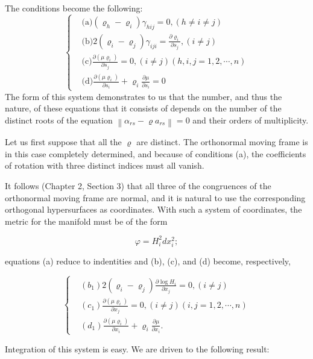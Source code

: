 \documentclass{book}
\begin{document}
The conditions become the following:
\begin{equation}
\begin{cases}
&\text{(a)}\displaystyle(\varrho_h-\varrho_i)\gamma_{hij}=0, (h\neq i\neq j)\\
&\text{(b)}\displaystyle2(\varrho_i-\varrho_j)\gamma_{iji}=\frac{\partial\varrho_i}{\partial s_j}, (i\neq j)\\
&\text{(c)}\displaystyle\frac{\partial(\mu\varrho_i)}{\partial s_j}=0, (i\neq j) (h,i,j=1,2,\cdots,n)\\
&\text{(d)}\displaystyle\frac{\partial(\mu\varrho_i)}{\partial s_i}+\varrho_i\frac{\partial\mu}{\partial s_i}=0
\end{cases}
\tag{E}
\end{equation}
The form of this system demonstrates to us that the number, and thus the nature, of these equations that it consists of depends on the number of the distinct roots of the equation $\left\|\alpha_{rs}-\varrho a_{rs}\right\|=0$ and their orders of multiplicity.

Let us first suppose that all the $\varrho$ are distinct. The orthonormal moving frame is in this case completely determined, and because of conditions (a), the coefficients of rotation with three distinct indices must all vanish.

It follows (Chapter 2, Section 3) that all three of the congruences of the orthonormal moving frame are normal, and it is natural to use the corresponding orthogonal hypersurfaces as coordinates. With such a system of coordinates, the metric for the manifold must be of the form

$$\varphi=H_i^2dx_i^2;$$

equations (a) reduce to indentities and (b), (c), and (d) become, respectively,

\begin{equation*}
\begin{cases}
&(b_1)\displaystyle2(\varrho_i-\varrho_j)\frac{\partial \log H_i}{\partial x_j}=0, (i\neq j)\\
&(c_1)\displaystyle\frac{\partial(\mu\varrho_i)}{\partial x_j}=0, (i\neq j) (i,j=1,2,\cdots,n)\\
&(d_1)\displaystyle\frac{\partial(\mu\varrho_i)}{\partial x_i}+\varrho_i\frac{\partial\mu}{\partial x_i}. 
\end{cases}
\end{equation*}

Integration of this system is easy. We are driven to the following result:
\end{document}
